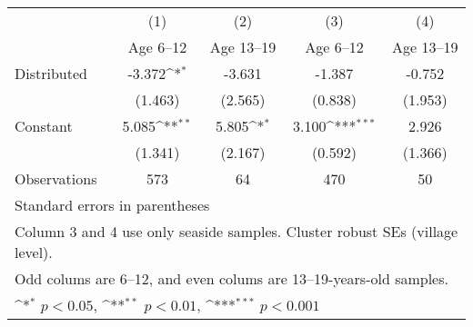 {
\def\sym#1{\ifmmode^{#1}\else\(^{#1}\)\fi}
\begin{tabular}{l*{4}{c}}
\hline\hline
                    &\multicolumn{1}{c}{(1)}&\multicolumn{1}{c}{(2)}&\multicolumn{1}{c}{(3)}&\multicolumn{1}{c}{(4)}\\
                    &\multicolumn{1}{c}{Age 6--12}&\multicolumn{1}{c}{Age 13--19}&\multicolumn{1}{c}{Age 6--12}&\multicolumn{1}{c}{Age 13--19}\\
\hline
Distributed         &      -3.372\sym{*}  &      -3.631         &      -1.387         &      -0.752         \\
                    &     (1.463)         &     (2.565)         &     (0.838)         &     (1.953)         \\
[1em]
Constant            &       5.085\sym{**} &       5.805\sym{*}  &       3.100\sym{***}&       2.926         \\
                    &     (1.341)         &     (2.167)         &     (0.592)         &     (1.366)         \\
\hline
Observations        &         573         &          64         &         470         &          50         \\
\hline\hline
\multicolumn{5}{l}{\footnotesize Standard errors in parentheses}\\
\multicolumn{5}{l}{\footnotesize Column 3 and 4 use only seaside samples. Cluster robust SEs (village level).}\\
\multicolumn{5}{l}{\footnotesize Odd colums are 6--12, and even colums are 13--19-years-old samples.}\\
\multicolumn{5}{l}{\footnotesize \sym{*} \(p<0.05\), \sym{**} \(p<0.01\), \sym{***} \(p<0.001\)}\\
\end{tabular}
}
